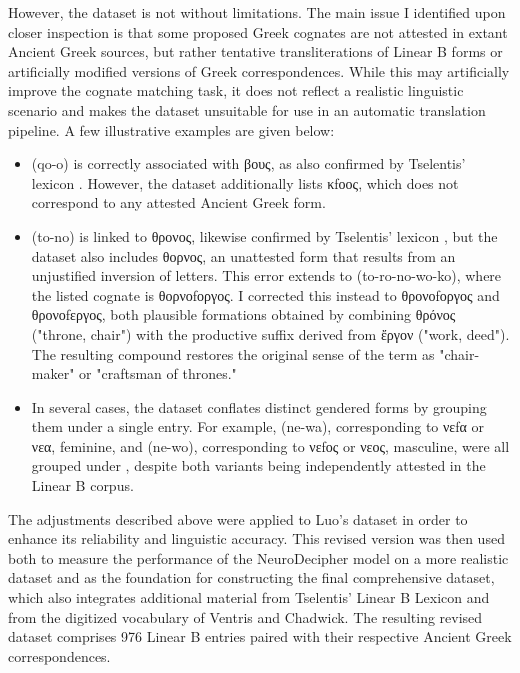 However, the dataset is not without limitations. 
The main issue I identified upon closer inspection is that some proposed Greek cognates are not attested in extant Ancient Greek sources, but rather tentative transliterations of Linear B forms or artificially modified versions of Greek correspondences.
While this may artificially improve the cognate matching task, it does not reflect a realistic linguistic scenario and makes the dataset unsuitable for use in an automatic translation pipeline.
A few illustrative examples are given below:

\begin{itemize}
\item \textlinb{\Bqo\Bo} (qo-o) is correctly associated with \textgreek{βους}, as also confirmed by Tselentis' lexicon \cite{tselentis}. However, the dataset additionally lists \textgreek{κfοος}, which does not correspond to any attested Ancient Greek form.
\item \textlinb{\Bto\Bo} (to-no) is linked to \textgreek{θρονος}, likewise confirmed by Tselentis' lexicon \cite{tselentis}, but the dataset also includes \textgreek{θορνος}, an unattested form that results from an unjustified inversion of letters.
This error extends to \textlinb{\Bto\Bro\Bno\Bwo\Bko} (to-ro-no-wo-ko), where the listed cognate is \textgreek{θορνοfοργος}. I corrected this instead to \textgreek{θρονοfοργος} and \textgreek{θρονοfεργος}, both plausible formations obtained by combining \textgreek{θρόνος} ("throne, chair") with the productive suffix derived from \textgreek{ἔργον} ("work, deed"). The resulting compound restores the original sense of the term as "chair-maker" or "craftsman of thrones."
\item In several cases, the dataset conflates distinct gendered forms by grouping them under a single entry. For example, \textlinb{\Bne\Bwa} (ne-wa), corresponding to \textgreek{νεfα} or \textgreek{νεα}, feminine, and \textlinb{\Bne\Bwo} (ne-wo), corresponding to \textgreek{νεfος} or \textgreek{νεος}, masculine, were all grouped under \textlinb{\Bne\Bwa}, despite both variants being independently attested in the Linear B corpus.
\end{itemize}

The adjustments described above were applied to Luo's dataset in order to enhance its reliability and linguistic accuracy.
This revised version was then used both to measure the performance of the NeuroDecipher model on a more realistic dataset and as the foundation for constructing the final comprehensive dataset, which also integrates additional material from Tselentis' Linear B Lexicon and from the digitized vocabulary of Ventris and Chadwick.
The resulting revised dataset comprises 976 Linear B entries paired with their respective Ancient Greek correspondences.

